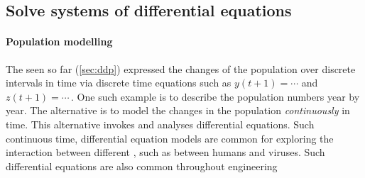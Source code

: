 




\subsection{Solve systems of differential equations}
\label{sec:ssde}

\paragraph{Population modelling}
The  seen so far (\cref{sec:ddp}) expressed the changes of the population over discrete intervals in time via discrete time equations such as \(y(t+1)=\cdots\) and \(z(t+1)=\cdots\)\,.
One such example is to describe the population numbers year by year.
The alternative is to model the changes in the population \emph{continuously} in time.
This alternative invokes and analyses differential equations.
Such continuous time, differential equation models are common for exploring the interaction between different , such as between humans and viruses.
Such differential equations are also common throughout engineering 

